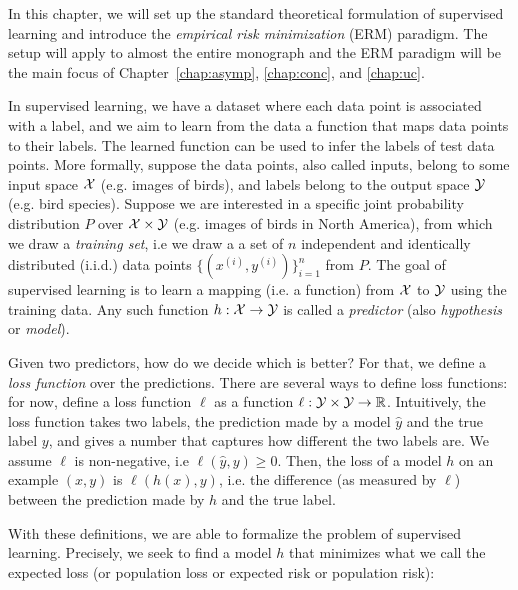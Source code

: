 
\setcounter{section}{0}



In this chapter, we will set up the standard theoretical formulation of supervised learning and introduce the \textit{empirical risk minimization} (ERM) paradigm. The setup will apply to almost the entire monograph and the ERM paradigm will be the main focus of Chapter~\ref{chap:asymp}, \ref{chap:conc}, and \ref{chap:uc}. 

\label{lec1:sec:sup-learn}
In supervised learning, we have a dataset where each data point is associated with a label, and we aim to learn from the data a function that maps data points to their labels. The learned  function can be used to infer the labels of test data points. More formally, suppose the data points, also called inputs,  belong to some input space $\mathcal X$ (e.g. images of birds), and labels belong to the output space $\mathcal Y$ (e.g. bird species). Suppose we are interested in a specific joint probability distribution $P$ over $\mathcal X \times \mathcal Y$ (e.g. images of birds in North America), from which we draw a \emph{training set}, i.e we draw a a set of $n$ independent and identically distributed (i.i.d.) data points $\{(x^{(i)}, y^{(i)})\}_{i=1}^n$ from $P$. The goal of supervised learning is to learn a mapping (i.e. a function) from $\mathcal X$ to $\mathcal Y$ using the training data. Any such function $h : \mathcal X \rightarrow \mathcal Y$ is called a \emph{predictor} (also \emph{hypothesis} or \emph{model}).

Given two predictors, how do we decide which is better? For that, we define a \emph{loss function} over the predictions. There are several ways to define loss functions: for now, define a loss function $\ell$ as a function $\ell : \mathcal Y \times \mathcal Y \rightarrow \mathbb R$. Intuitively, the loss function takes two labels, the prediction made by a model $\hat{y}$ and the true label $y$, and gives a number that captures how different the two labels are. We assume $\ell$ is non-negative, i.e $\ell(\hat{y}, y) \geq 0$. Then, the loss of a model $h$ on an example $(x, y)$ is $\ell(h(x), y)$, i.e. the difference (as measured by $\ell$) between the prediction made by $h$ and the true label.


With these definitions, we are able to formalize the problem of supervised learning. Precisely, we seek to find a model $h$ that minimizes what we call the expected loss (or population loss or expected risk or population risk):


